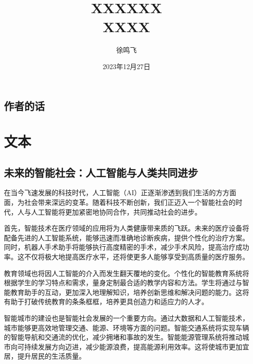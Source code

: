 \documentclass[11pt, a4paper, oneside]{ctexbook}
\title{{\Huge{\textbf{XXXXXX}}}\\XXXX}
\author{徐鸣飞}
\date{2023年12月27日}
\begin{document}
\maketitle

\newpage                    %
\setcounter{page}{1}        %
\section*{作者的话}

\newpage                    %
\setcounter{page}{1}        %
\tableofcontents            %

\newpage                    %
\setcounter{page}{1}        %

\chapter{文本}
\section{未来的智能社会：人工智能与人类共同进步}
在当今飞速发展的科技时代，人工智能（AI）正逐渐渗透到我们生活的方方面面，为社会带来深远的变革。随着科技不断创新，我们正迈入一个智能社会的时代，人与人工智能将更加紧密地协同合作，共同推动社会的进步。

首先，智能技术在医疗领域的应用将为人类健康带来质的飞跃。未来的医疗设备将配备先进的人工智能系统，能够迅速而准确地诊断疾病，提供个性化的治疗方案。同时，机器人手术助手将能够执行高度精密的手术，减少手术风险，提高治疗成功率。这不仅将极大地提高医疗水平，还将使更多人能够享受到高质量的医疗服务。

教育领域也将因人工智能的介入而发生翻天覆地的变化。个性化的智能教育系统将根据学生的学习特点和需求，量身定制最合适的教学内容和方法。学生将通过与智能教育助手的互动，更加深入地理解知识，培养创新思维和解决问题的能力。这将有助于打破传统教育的条条框框，培养更具创造力和适应力的人才。

智能城市的建设也是智能社会发展的一个重要方向。通过大数据和人工智能技术，城市能够更高效地管理交通、能源、环境等方面的问题。智能交通系统将实现车辆的智能导航和交通流的优化，减少拥堵和事故的发生。智能能源管理系统将推动城市向可持续发展方向迈进，减少能源浪费，提高能源利用效率。这将使城市更加宜居，提升居民的生活质量。
\end{document}
